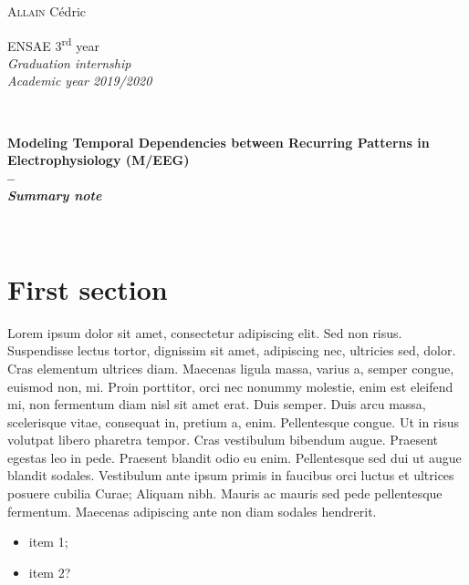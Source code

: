 \begin{minipage}{0.45\textwidth}
  \begin{flushleft} \Large
    \textsc{Allain} Cédric
  \end{flushleft}
\end{minipage}
\begin{minipage}{0.45\textwidth}
  \begin{flushright} \Large
    ENSAE 3\textsuperscript{rd} year\\
    \textit{Graduation internship}\\
    \textit{Academic year 2019/2020}
  \end{flushright}
\end{minipage}
	
{\centering

\vspace{1.5cm}
\HRule \\[0.5cm]
{\huge\bfseries Modeling Temporal Dependencies between Recurring Patterns in Electrophysiology (M/EEG) \\ -- \\ \textit{Summary note} \par}
\bigskip
\HRule \\[0.5cm]
\vspace{0.5cm}
}

\setlength{\parskip}{5pt}

{}
\section*{First section}
Lorem ipsum dolor sit amet, consectetur adipiscing elit. Sed non risus. Suspendisse lectus tortor, dignissim sit amet, adipiscing nec, ultricies sed, dolor. Cras elementum ultrices diam. Maecenas ligula massa, varius a, semper congue, euismod non, mi. Proin porttitor, orci nec nonummy molestie, enim est eleifend mi, non fermentum diam nisl sit amet erat. Duis semper. Duis arcu massa, scelerisque vitae, consequat in, pretium a, enim. Pellentesque congue. Ut in risus volutpat libero pharetra tempor. Cras vestibulum bibendum augue. Praesent egestas leo in pede. Praesent blandit odio eu enim. Pellentesque sed dui ut augue blandit sodales. Vestibulum ante ipsum primis in faucibus orci luctus et ultrices posuere cubilia Curae; Aliquam nibh. Mauris ac mauris sed pede pellentesque fermentum. Maecenas adipiscing ante non diam sodales hendrerit.

\begin{itemize}
    \item item 1;
    \item item 2?
\end{itemize}